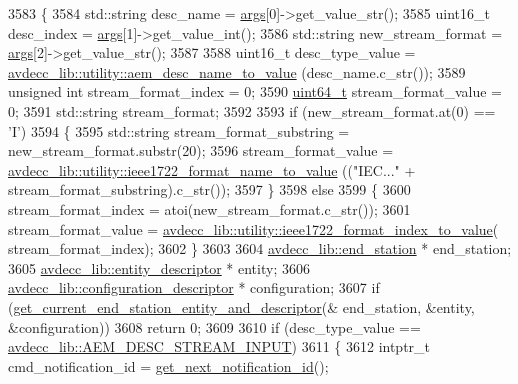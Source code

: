 \begin{DoxyCode}
3583 \{
3584     std::string desc\_name = \hyperlink{namespaceastime__fitline_a8187411843a6284ffb964ef3fb9fcab3}{args}[0]->get\_value\_str();
3585     uint16\_t desc\_index = \hyperlink{namespaceastime__fitline_a8187411843a6284ffb964ef3fb9fcab3}{args}[1]->get\_value\_int();
3586     std::string new\_stream\_format = \hyperlink{namespaceastime__fitline_a8187411843a6284ffb964ef3fb9fcab3}{args}[2]->get\_value\_str();
3587 
3588     uint16\_t desc\_type\_value = \hyperlink{namespaceavdecc__lib_1_1utility_a9f6076e32fa227555a95b6e95ea1e29b}{avdecc\_lib::utility::aem\_desc\_name\_to\_value}
      (desc\_name.c\_str());
3589     \textcolor{keywordtype}{unsigned} \textcolor{keywordtype}{int} stream\_format\_index = 0;
3590     \hyperlink{parse_8c_aec6fcb673ff035718c238c8c9d544c47}{uint64\_t} stream\_format\_value = 0;
3591     std::string stream\_format;
3592 
3593     \textcolor{keywordflow}{if} (new\_stream\_format.at(0) == \textcolor{charliteral}{'I'})
3594     \{
3595         std::string stream\_format\_substring = new\_stream\_format.substr(20);
3596         stream\_format\_value = \hyperlink{namespaceavdecc__lib_1_1utility_abde103d2263df28ca5d366435cb10dc2}{avdecc\_lib::utility::ieee1722\_format\_name\_to\_value}
      ((\textcolor{stringliteral}{"IEC..."} + stream\_format\_substring).c\_str());
3597     \}
3598     \textcolor{keywordflow}{else}
3599     \{
3600         stream\_format\_index = atoi(new\_stream\_format.c\_str());
3601         stream\_format\_value = 
      \hyperlink{namespaceavdecc__lib_1_1utility_a0c84e161bd14ecd50137b4f16a1fb4f8}{avdecc\_lib::utility::ieee1722\_format\_index\_to\_value}(
      stream\_format\_index);
3602     \}
3603 
3604     \hyperlink{classavdecc__lib_1_1end__station}{avdecc\_lib::end\_station} * end\_station;
3605     \hyperlink{classavdecc__lib_1_1entity__descriptor}{avdecc\_lib::entity\_descriptor} * entity;
3606     \hyperlink{classavdecc__lib_1_1configuration__descriptor}{avdecc\_lib::configuration\_descriptor} * configuration;
3607     \textcolor{keywordflow}{if} (\hyperlink{classcmd__line_ac2d4611fba7db03d436a2e3c1e64828e}{get\_current\_end\_station\_entity\_and\_descriptor}(&
      end\_station, &entity, &configuration))
3608         \textcolor{keywordflow}{return} 0;
3609 
3610     \textcolor{keywordflow}{if} (desc\_type\_value == \hyperlink{namespaceavdecc__lib_ac7b7d227e46bc72b63ee9e9aae15902fa00d002e47651a1b007d50f9f2da51e53}{avdecc\_lib::AEM\_DESC\_STREAM\_INPUT})
3611     \{
3612         intptr\_t cmd\_notification\_id = \hyperlink{classcmd__line_a57486218387d1aa9d262eb7c176154ad}{get\_next\_notification\_id}();

\end{DoxyCode}
